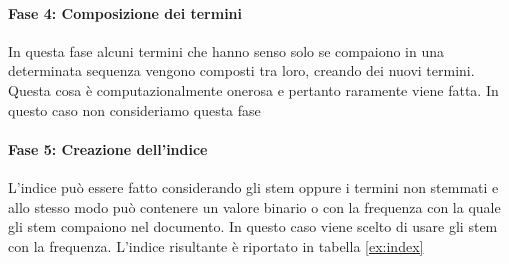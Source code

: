 \paragraph{Fase 4: Composizione dei termini}

In questa fase alcuni termini che hanno senso solo se compaiono in una determinata sequenza vengono composti tra loro, creando dei nuovi termini. Questa cosa è computazionalmente onerosa e pertanto raramente viene fatta. In questo caso non consideriamo questa fase

\paragraph{Fase 5: Creazione dell'indice}

L'indice può essere fatto considerando gli stem oppure i termini non stemmati e allo stesso modo può contenere un valore binario o con la frequenza con la quale gli stem compaiono nel documento.
In questo caso viene scelto di usare gli stem con la frequenza.
L'indice risultante è riportato in tabella \ref{ex:index}


